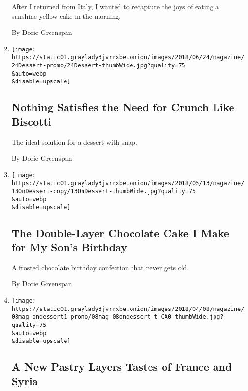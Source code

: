 \begin{enumerate}
  After I returned from Italy, I wanted to recapture the joys of eating
  a sunshine yellow cake in the morning.

  By Dorie Greenspan
\item
  \href{/2018/06/19/magazine/nothing-satisfies-the-need-for-crunch-like-biscotti.html}{}

  \texttt{[image: https://static01.graylady3jvrrxbe.onion/images/2018/06/24/magazine/24Dessert-promo/24Dessert-thumbWide.jpg?quality=75\\\&auto=webp\\\&disable=upscale]}

  \hypertarget{nothing-satisfies-the-need-for-crunch-like-biscotti}{%
  \subsection{Nothing Satisfies the Need for Crunch Like
  Biscotti}\label{nothing-satisfies-the-need-for-crunch-like-biscotti}}

  The ideal solution for a dessert with snap.

  By Dorie Greenspan
\item
  \href{/2018/05/09/magazine/chocolate-cake-sons-birthday-devils-food.html}{}

  \texttt{[image: https://static01.graylady3jvrrxbe.onion/images/2018/05/13/magazine/13OnDessert-copy/13OnDessert-thumbWide.jpg?quality=75\\\&auto=webp\\\&disable=upscale]}

  \hypertarget{the-double-layer-chocolate-cake-i-make-for-my-sons-birthday}{%
  \subsection{The Double-Layer Chocolate Cake I Make for My Son's
  Birthday}\label{the-double-layer-chocolate-cake-i-make-for-my-sons-birthday}}

  A frosted chocolate birthday confection that never gets old.

  By Dorie Greenspan
\item
  \href{/2018/04/03/magazine/pastry-france-syria-baklava-mille-feuille.html}{}

  \texttt{[image: https://static01.graylady3jvrrxbe.onion/images/2018/04/08/magazine/08mag-ondessert1-promo/08mag-08ondessert-t\_CA0-thumbWide.jpg?quality=75\\\&auto=webp\\\&disable=upscale]}

  \hypertarget{a-new-pastry-layers-tastes-of-france-and-syria}{%
  \subsection{A New Pastry Layers Tastes of France and
  Syria}\label{a-new-pastry-layers-tastes-of-france-and-syria}}


\end{enumerate}
